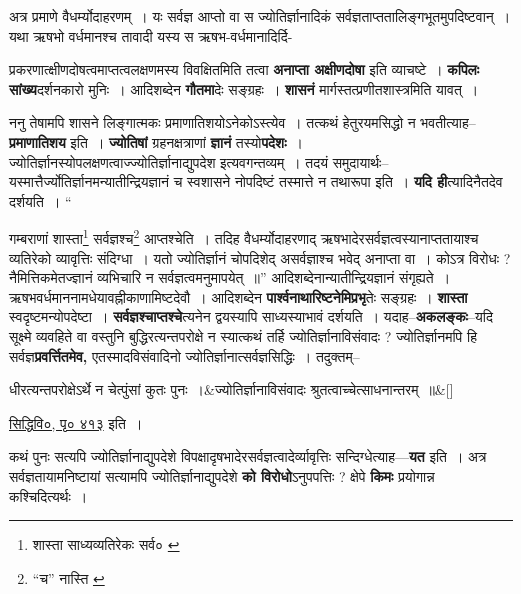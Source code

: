 \documentclass[article,12pt,a4paper]{memoir}
\begin{document}
	  \pstart अत्र प्रमाणे वैधर्म्योदाहरणम् । यः सर्वज्ञ आप्तो वा स ज्योतिर्ज्ञानादिकं सर्वज्ञताप्ततालिङ्गभूतमुपदिष्टवान् । यथा ऋषभो वर्धमानश्च तावादी यस्य स ऋषभ-वर्धमानादिर्दि-
	\pend
      
	  \endgroup
	

	  \pstart प्रकरणात्क्षीणदोषत्वमाप्तत्वलक्षणमस्य विवक्षितमिति तत्वा \textbf{अनाप्ता अक्षीणदोषा} इति व्याचष्टे । \textbf{कपिलः सांख्य}दर्शनकारो मुनिः । आदिशब्देन \textbf{गौतमा}देः सङ्ग्रहः । \textbf{शासनं} मार्गस्तत्प्रणीतशास्त्रमिति यावत् ।
	\pend
      

	  \pstart ननु तेषामपि शासने लिङ्गात्मकः प्रमाणातिशयोऽनेकोऽस्त्येव । तत्कथं हेतुरयमसिद्धो न भवतीत्याह--\textbf{प्रमाणातिशय} इति । \textbf{ज्योतिषां} ग्रहनक्षत्राणां \textbf{ज्ञानं} तस्यो\textbf{पदेशः} । ज्योतिर्ज्ञानस्योपलक्षणत्वाज्ज्योतिर्ज्ञानाद्युपदेश इत्यवगन्तव्यम् । तदयं समुदायार्थः--यस्मात्तैर्ज्योतिर्ज्ञानमन्यातीन्द्रियज्ञानं च स्वशासने नोपदिष्टं तस्मात्ते न तथारूपा इति । \textbf{यदि ही}त्यादिनैतदेव दर्शयति ।  \leavevmode{} “
	  
	गम्बराणां शास्ता\footnote{शास्ता साध्यव्यतिरेकः सर्व० \cite{dp-msC}} सर्वज्ञश्च\footnote{“च” नास्ति \cite{dp-msA} \cite{dp-msB} \cite{dp-edP} \cite{dp-edH} \cite{dp-edE} \cite{dp-edN}} आप्तश्चेति । तदिह वैधर्म्योदाहरणाद् ऋषभादेरसर्वज्ञत्वस्यानाप्ततायाश्च व्यतिरेको व्यावृत्तिः संदिग्धा । यतो ज्योतिर्ज्ञानं चोपदिशेद् असर्वज्ञाश्च भवेद् अनाप्ता वा । कोऽत्र विरोधः ? नैमित्तिकमेतज्ज्ञानं व्यभिचारि न सर्वज्ञत्वमनुमापयेत् ॥” आदिशब्देनान्यातीन्द्रियज्ञानं संगृह्यते । ऋषभवर्धमाननामधेयावह्नीकाणामिष्टदेवौ । आदिशब्देन \textbf{पार्श्वनाथारिष्टनेमिप्रभृ}तेः सङ्ग्रहः । \textbf{शास्ता} स्वदृष्टमन्योपदेष्टा । \textbf{सर्वज्ञश्चाप्तश्चे}त्यनेन द्वयस्यापि साध्यस्याभावं दर्शयति । यदाह--\textbf{अकलङ्कः}--यदि सूक्ष्मे व्यवहिते वा वस्तुनि बुद्धिरत्यन्तपरोक्षे न स्यात्कथं तर्हि ज्योतिर्ज्ञानाविसंवादः ? ज्योतिर्ज्ञानमपि हि सर्वज्ञ\textbf{प्रवर्त्तितमेव,} एतस्मादविसंवादिनो ज्योतिर्ज्ञानात्सर्वज्ञसिद्धिः । तदुक्तम्--
	\pend
      
	  \bigskip
	  \begingroup
	
	    
	    \stanza[\smallbreak]
	धीरत्यन्तपरोक्षेऽर्थे न चेत्पुंसां कुतः पुनः ।&ज्योतिर्ज्ञानाविसंवादः श्रुतत्वाच्चेत्साधनान्तरम् ॥\&[\smallbreak]


	\href{http://http://sarit.indology.info/?cref=svi.p413}{सिद्धिवि०, पृ० ४१३} इति ।
	  \endgroup
	

	  \pstart कथं पुनः सत्यपि ज्योतिर्ज्ञानाद्युपदेशे विपक्षादृषभादेरसर्वज्ञत्वादेर्व्यावृत्तिः सन्दिग्धेत्याह—\textbf{यत} इति । अत्र सर्वज्ञतायामनिष्टायां सत्यामपि ज्योतिर्ज्ञानाद्युपदेशे \textbf{को विरोधो}ऽनुपपत्तिः ? क्षेपे \textbf{किमः} प्रयोगान्न कश्चिदित्यर्थः ।
	\pend
      
\end{document}
